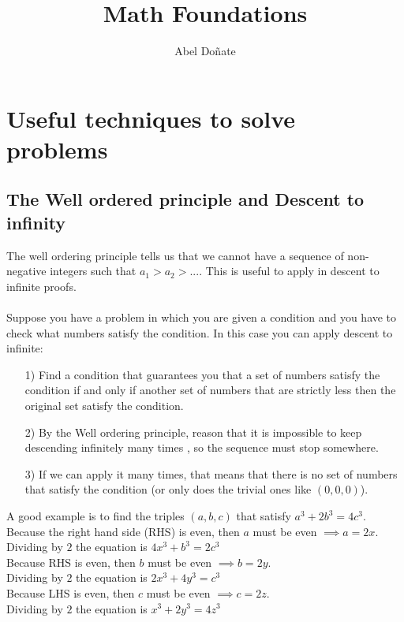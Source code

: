 \documentclass[12pt]{article}
\title{Math Foundations}
\author{Abel Doñate}
\date{}
\begin{document}
\maketitle
\tableofcontents
\newpage

\section{Useful techniques to solve problems}
    \subsection{The Well ordered principle and Descent to infinity}
    The well ordering principle tells us that we cannot have a sequence of non-negative integers such that $a_1>a_2>...$.
    This is useful to apply in descent to infinite proofs. \\ \\
    Suppose you have a problem in which you are given a condition and you have to check what numbers satisfy the condition. In this case you can apply descent to infinite:
    \begin{itemize}
        \item[1)] Find a condition that guarantees you that a set of numbers satisfy the condition if and only if another set of numbers that are strictly less then the original set satisfy the condition.
        \item[2)] By the Well ordering principle, reason that it is impossible to keep descending infinitely many times , so the sequence must stop somewhere.
        \item[3)] If we can apply it many times, that means that there is no set of numbers that satisfy the condition (or only does the trivial ones like $(0,0,0)$).
    \end{itemize}
    A good example is to find the triples $(a, b, c)$ that satisfy $a^3 + 2b^3 = 4c^3$.\\
    Because the right hand side (RHS) is even, then $a$ must be even $\implies a=2x$. \\
    Dividing by $2$ the equation is $4x^3 + b^3 = 2c^3$ \\
    Because RHS is even, then $b$ must be even $\implies b=2y$. \\
    Dividing by $2$ the equation is $2x^3 + 4y^3 = c^3$ \\
    Because LHS is even, then $c$ must be even $\implies c=2z$. \\
    Dividing by $2$ the equation is $x^3 + 2y^3 = 4z^3$ \\
    
\end{document}
